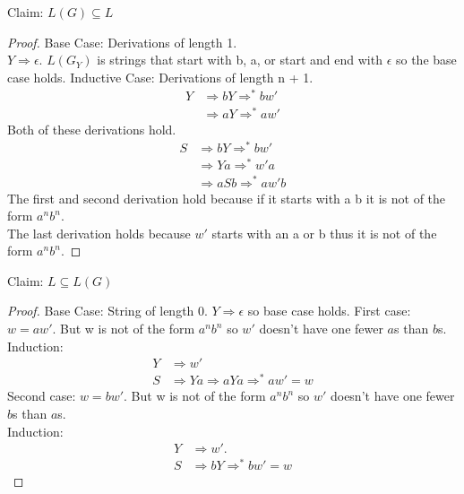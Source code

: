 \begin{problem}{2}
  \begin{solution}
    Claim: $L(G) \subseteq L$
    \begin{proof}
      Base Case: Derivations of length 1.\\
      $Y \Rightarrow \epsilon$. $L(G_Y)$ is strings that start with b, a, or start and end with $\epsilon$ so the base case holds.
      \br
      Inductive Case: Derivations of length n + 1. \\
      \begin{align*}
        Y &\Rightarrow bY \Rightarrow^* bw' \\
          &\Rightarrow aY \Rightarrow^* aw'
      \end{align*}
      Both of these derivations hold.
      \begin{align*}
        S &\Rightarrow bY \Rightarrow^* bw' \\
          &\Rightarrow Ya \Rightarrow^* w'a \\
          &\Rightarrow aSb \Rightarrow^* aw'b
      \end{align*}
      The first and second derivation hold because if it starts with a b it is not of the form $a^nb^n$. \\
      The last derivation holds because $w'$ starts with an a or b thus it is not of the form $a^nb^n$.
    \end{proof}
    \noindent Claim: $L \subseteq L(G)$
    \begin{proof}
      Base Case: String of length 0. $Y \Rightarrow \epsilon$ so base case holds.
      \br
      First case: $w = aw'$. But w is not of the form $a^nb^n$ so $w'$ doesn't have one fewer $a$s than $b$s. \\
      Induction:
      \begin{align*}
        Y &\Rightarrow w' \\
        S &\Rightarrow Ya \Rightarrow aYa \Rightarrow^* aw' = w
      \end{align*}
      Second case: $w = bw'$. But w is not of the form $a^nb^n$ so $w'$ doesn't have one fewer $b$s than $a$s.\\
      Induction:\\
      \begin{align*}
        Y &\Rightarrow w'. \\
        S &\Rightarrow bY \Rightarrow^* bw' = w
      \end{align*}
    \end{proof}
  \end{solution}
\end{problem}

